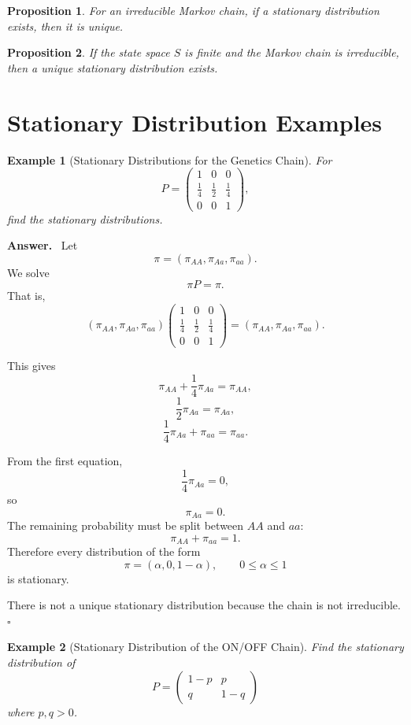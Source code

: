 \documentclass[12pt,a4paper]{article}
\theoremstyle{lecturestyle}
\newtheorem{example}{Example}
\newtheorem{proposition}{Proposition}
\newenvironment{answer}
{\par\textbf{Answer.}\ }
{\hfill$\square$\par}
\begin{document}
\begin{proposition}
For an irreducible Markov chain, if a stationary distribution exists, then it is unique.
\end{proposition}

\begin{proposition}
If the state space $S$ is finite and the Markov chain is irreducible, then a unique stationary distribution exists.
\end{proposition}

\section{Stationary Distribution Examples}

\begin{example}[Stationary Distributions for the Genetics Chain]
For
\[
P=
\begin{pmatrix}
1 & 0 & 0\\
\frac14 & \frac12 & \frac14\\
0 & 0 & 1
\end{pmatrix},
\]
find the stationary distributions.
\end{example}

\begin{answer}
Let
\[
\pi=(\pi_{AA},\pi_{Aa},\pi_{aa}).
\]
We solve
\[
\pi P=\pi.
\]
That is,
\[
(\pi_{AA},\pi_{Aa},\pi_{aa})
\begin{pmatrix}
1 & 0 & 0\\
\frac14 & \frac12 & \frac14\\
0 & 0 & 1
\end{pmatrix}
=
(\pi_{AA},\pi_{Aa},\pi_{aa}).
\]

This gives
\[
\pi_{AA}+\frac14\pi_{Aa}=\pi_{AA},
\]
\[
\frac12\pi_{Aa}=\pi_{Aa},
\]
\[
\frac14\pi_{Aa}+\pi_{aa}=\pi_{aa}.
\]

From the first equation,
\[
\frac14\pi_{Aa}=0,
\]
so
\[
\pi_{Aa}=0.
\]
The remaining probability must be split between $AA$ and $aa$:
\[
\pi_{AA}+\pi_{aa}=1.
\]
Therefore every distribution of the form
\[
\boxed{\pi=(\alpha,0,1-\alpha),\qquad 0\leq \alpha\leq 1}
\]
is stationary.

There is not a unique stationary distribution because the chain is not irreducible.
\end{answer}

\begin{example}[Stationary Distribution of the ON/OFF Chain]
Find the stationary distribution of
\[
P=
\begin{pmatrix}
1-p & p\\
q & 1-q
\end{pmatrix}
\]
where $p,q>0$.
\end{example}
\end{document}
